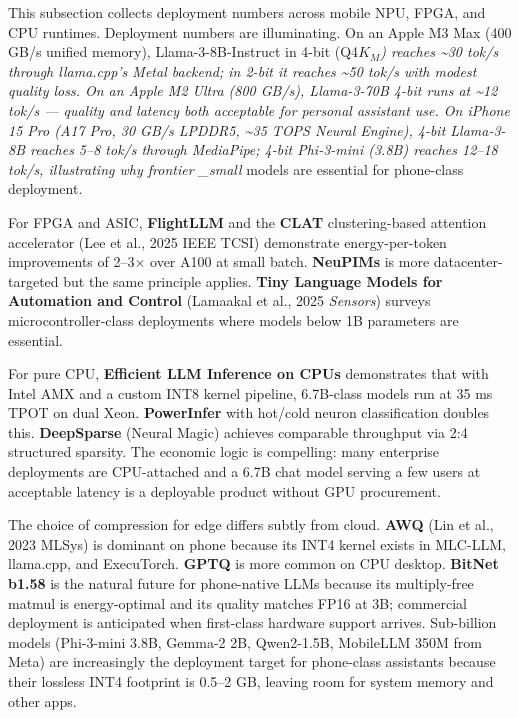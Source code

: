 \documentclass{article}
\begin{document}
This subsection collects deployment numbers across mobile NPU, FPGA, and CPU runtimes. Deployment numbers are illuminating. On an Apple M3 Max (400 GB/s unified memory), Llama-3-8B-Instruct in 4-bit (Q4\emph{\(K_M\)) reaches \textasciitilde30 tok/s through llama.cpp's Metal backend; in 2-bit it reaches \textasciitilde50 tok/s with modest quality loss. On an Apple M2 Ultra (800 GB/s), Llama-3-70B 4-bit runs at \textasciitilde12 tok/s --- quality and latency both acceptable for personal assistant use. On iPhone 15 Pro (A17 Pro, 30 GB/s LPDDR5, \textasciitilde35 TOPS Neural Engine), 4-bit Llama-3-8B reaches 5--8 tok/s through MediaPipe; 4-bit Phi-3-mini (3.8B) reaches 12--18 tok/s, illustrating why frontier \_small} models are essential for phone-class deployment.

For FPGA and ASIC, \textbf{FlightLLM} \citep{zeng20242024} and the \textbf{CLAT} clustering-based attention accelerator (Lee et al., 2025 IEEE TCSI) demonstrate energy-per-token improvements of 2--3× over A100 at small batch. \textbf{NeuPIMs} \citep{heo20242024} is more datacenter-targeted but the same principle applies. \textbf{Tiny Language Models for Automation and Control} (Lamaakal et al., 2025 \emph{Sensors}) surveys microcontroller-class deployments where models below 1B parameters are essential.

For pure CPU, \textbf{Efficient LLM Inference on CPUs} \citep{shen20232023} demonstrates that with Intel AMX and a custom INT8 kernel pipeline, 6.7B-class models run at 35 ms TPOT on dual Xeon. \textbf{PowerInfer} with hot/cold neuron classification doubles this. \textbf{DeepSparse} (Neural Magic) achieves comparable throughput via 2:4 structured sparsity. The economic logic is compelling: many enterprise deployments are CPU-attached and a 6.7B chat model serving a few users at acceptable latency is a deployable product without GPU procurement.

The choice of compression for edge differs subtly from cloud. \textbf{AWQ} (Lin et al., 2023 MLSys) is dominant on phone because its INT4 kernel exists in MLC-LLM, llama.cpp, and ExecuTorch. \textbf{GPTQ} is more common on CPU desktop. \textbf{BitNet b1.58} is the natural future for phone-native LLMs because its multiply-free matmul is energy-optimal and its quality matches FP16 at 3B; commercial deployment is anticipated when first-class hardware support arrives. Sub-billion models (Phi-3-mini 3.8B, Gemma-2 2B, Qwen2-1.5B, MobileLLM 350M from Meta) are increasingly the deployment target for phone-class assistants because their lossless INT4 footprint is 0.5--2 GB, leaving room for system memory and other apps.
\end{document}

